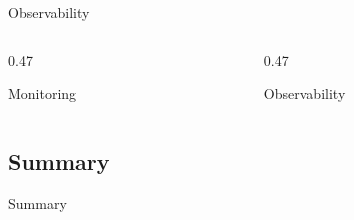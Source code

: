 \begin{frame}{Observability}
  \begin{columns}[T,onlytextwidth]
    \begin{column}{0.47\textwidth}
      \begin{tdblockt}[equal height group=obs]{Monitoring}
      \end{tdblockt}
    \end{column}
    \begin{column}{0.47\textwidth}
      \begin{tdblockt}[equal height group=obs]{Observability}
      \end{tdblockt}
    \end{column}
  \end{columns}
  \begin{takeaway}
  \end{takeaway}
\end{frame}

\subsection{Summary}

\begin{frame}{Summary}
  \begin{takeaway}
  \end{takeaway}
\end{frame}

\chapterreferences
